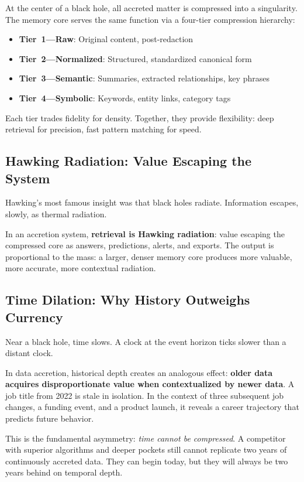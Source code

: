 \documentclass[11pt,twocolumn]{article}
\begin{document}
At the center of a black hole, all accreted matter is compressed into a singularity. The memory core serves the same function via a four-tier compression hierarchy:

\begin{itemize}[nosep,leftmargin=1.2em]
  \item \textbf{Tier~1---Raw}: Original content, post-redaction
  \item \textbf{Tier~2---Normalized}: Structured, standardized canonical form
  \item \textbf{Tier~3---Semantic}: Summaries, extracted relationships, key phrases
  \item \textbf{Tier~4---Symbolic}: Keywords, entity links, category tags
\end{itemize}

Each tier trades fidelity for density. Together, they provide flexibility: deep retrieval for precision, fast pattern matching for speed.

\subsection{Hawking Radiation: Value Escaping the System}

Hawking's most famous insight was that black holes radiate. Information escapes, slowly, as thermal radiation.

In an accretion system, \textbf{retrieval is Hawking radiation}: value escaping the compressed core as answers, predictions, alerts, and exports. The output is proportional to the mass: a larger, denser memory core produces more valuable, more accurate, more contextual radiation.

\subsection{Time Dilation: Why History Outweighs Currency}

Near a black hole, time slows. A clock at the event horizon ticks slower than a distant clock.

In data accretion, historical depth creates an analogous effect: \textbf{older data acquires disproportionate value when contextualized by newer data}. A job title from 2022 is stale in isolation. In the context of three subsequent job changes, a funding event, and a product launch, it reveals a career trajectory that predicts future behavior.

This is the fundamental asymmetry: \emph{time cannot be compressed}. A competitor with superior algorithms and deeper pockets still cannot replicate two years of continuously accreted data. They can begin today, but they will always be two years behind on temporal depth.
\end{document}
